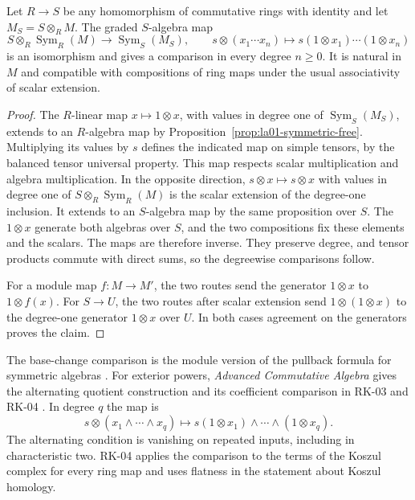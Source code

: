 \begin{theorem}
\label{thm:la01-symmetric-base-change}
Let \(R\to S\) be any homomorphism of commutative rings with
identity and let \(M_S=S\otimes_R M\). The graded \(S\)-algebra map
\[
  S\otimes_R \operatorname{Sym}_R(M)
  \longrightarrow \operatorname{Sym}_S(M_S),
  \qquad
  s\otimes (x_1\cdots x_n)\longmapsto
       s(1\otimes x_1)\cdots(1\otimes x_n)
\]
is an isomorphism and gives a comparison in every degree \(n\ge 0\).
It is natural in \(M\) and compatible with compositions of
ring maps under the usual associativity of scalar extension.
\end{theorem}
\begin{proof}
The \(R\)-linear map \(x\mapsto 1\otimes x\), with values in
degree one of \(\operatorname{Sym}_S(M_S)\), extends to an
\(R\)-algebra map by Proposition~\ref{prop:la01-symmetric-free}.
Multiplying its values by \(s\) defines the indicated map on
simple tensors, by the balanced tensor universal property. This
map respects scalar multiplication and algebra multiplication.
In the opposite direction, \(s\otimes x\mapsto s\otimes x\) with
values in degree one of \(S\otimes_R\operatorname{Sym}_R(M)\)
is the scalar extension of the degree-one inclusion. It extends
to an \(S\)-algebra map by the same proposition over \(S\).
The \(1\otimes x\) generate both algebras over \(S\), and the
two compositions fix these elements and the scalars. The maps
are therefore inverse. They preserve degree, and tensor products
commute with direct sums, so the degreewise comparisons follow.

For a module map \(f\colon M\to M'\), the two routes send the
generator \(1\otimes x\) to \(1\otimes f(x)\). For \(S\to U\),
the two routes after scalar extension send \(1\otimes(1\otimes
x)\) to the degree-one generator \(1\otimes x\) over \(U\).
In both cases agreement on the generators proves the claim.
\end{proof}

The base-change comparison is the module version of the pullback
formula for symmetric algebras
\cite[Modules, Lemma 17.21.3]{stacks-sym}. For exterior powers,
\emph{Advanced Commutative Algebra} gives the alternating quotient
construction and its coefficient comparison in RK-03 and RK-04
\cite[RK-03 and RK-04]{commalg}. In degree \(q\) the map is
\[
  s\otimes(x_1\wedge\cdots\wedge x_q)
  \longmapsto s(1\otimes x_1)\wedge\cdots\wedge(1\otimes x_q).
\]
The alternating condition is vanishing on repeated inputs,
including in characteristic two. RK-04 applies the comparison to
the terms of the Koszul complex for every ring map and uses
flatness in the statement about Koszul homology.

